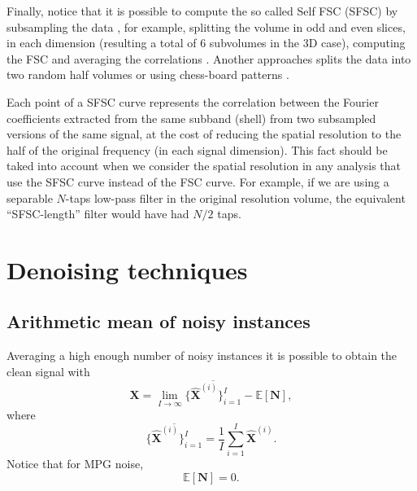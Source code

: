 \documentclass{article}
\begin{document}
Finally, notice that it is possible to compute the so called Self FSC
(SFSC) by subsampling the data \cite{koho2019fourier}, for example,
splitting the volume in odd and even slices, in each dimension
(resulting a total of 6 subvolumes in the 3D case), computing the FSC
and averaging the correlations \cite{verbeke2024self}. Another
approaches splits the data into two random half volumes
\cite{verbeke2024self} or using chess-board patterns
\cite{koho2019fourier}.

Each point of a SFSC curve represents the correlation between the
Fourier coefficients extracted from the same subband (shell) from two
subsampled versions of the same signal, at the cost of reducing the
spatial resolution to the half of the original frequency (in each
signal dimension). This fact should be taked into account when we
consider the spatial resolution in any analysis that use the SFSC
curve instead of the FSC curve. For example, if we are using a
separable $N$-taps low-pass filter in the original resolution volume,
the equivalent ``SFSC-length'' filter would have had $N/2$ taps.



\section{Denoising techniques}


\subsection{Arithmetic mean of noisy instances}

Averaging a high enough number of noisy instances it is possible to obtain the clean signal with
\begin{equation}
  {\mathbf X} = \lim_{I \to \infty} \overline{\{\hat{\mathbf X}^{(i)}\}_{i=1}^I}  - \mathbb{E}\left[\mathbf{N}\right],
  \label{eq:mean_with_bias}
\end{equation}
where
\begin{equation}
  \overline{\{\hat{\mathbf X}^{(i)}\}_{i=1}^I} = \frac{1}{I} \sum_{i=1}^I \hat{\mathbf X}^{(i)}.
  \label{eq:mean}
\end{equation}
Notice that for MPG noise,
\begin{equation}
  \mathbb{E}\left[\mathbf{N}\right] = 0.
\end{equation}
\end{document}
